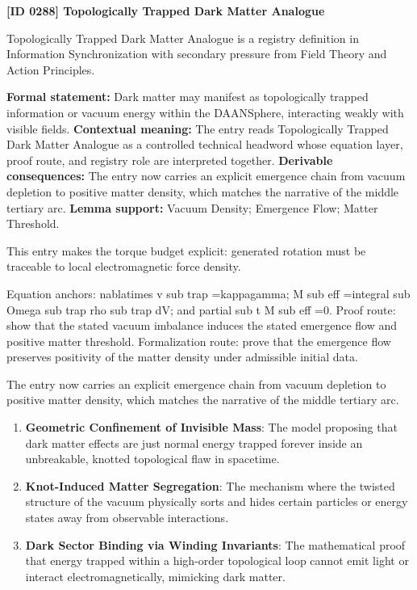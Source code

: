 \clearpage
\noindent\textbf{[ID 0288] Topologically Trapped Dark Matter Analogue}\par
\vspace{0.35em}
\begingroup\small
{}
Topologically Trapped Dark Matter Analogue is a registry definition in Information Synchronization with secondary pressure from Field Theory and Action Principles.

\begingroup\footnotesize\setlength{\emergencystretch}{3em}\sloppy
\textbf{Formal statement:} Dark matter may manifest as topologically trapped information or vacuum energy within the DAANSphere, interacting weakly with visible fields. \textbf{Contextual meaning:} The entry reads Topologically Trapped Dark Matter Analogue as a controlled technical headword whose equation layer, proof route, and registry role are interpreted together. \textbf{Derivable consequences:} The entry now carries an explicit emergence chain from vacuum depletion to positive matter density, which matches the narrative of the middle tertiary arc. \textbf{Lemma support:} Vacuum Density; Emergence Flow; Matter Threshold.\par
\endgroup

This entry makes the torque budget explicit: generated rotation must be traceable to local electromagnetic force density.

Equation anchors: nablatimes v sub trap =kappagamma; M sub eff =integral sub Omega sub trap rho sub trap dV; and partial sub t M sub eff =0. Proof route: show that the stated vacuum imbalance induces the stated emergence flow and positive matter threshold. Formalization route: prove that the emergence flow preserves positivity of the matter density under admissible initial data.

The entry now carries an explicit emergence chain from vacuum depletion to positive matter density, which matches the narrative of the middle tertiary arc.
\endgroup

\begin{enumerate}[leftmargin=1.6em,itemsep=6pt,topsep=4pt]
\item \textbf{Geometric Confinement of Invisible Mass}: The model proposing that dark matter effects are just normal energy trapped forever inside an unbreakable, knotted topological flaw in spacetime.
\item \textbf{Knot-Induced Matter Segregation}: The mechanism where the twisted structure of the vacuum physically sorts and hides certain particles or energy states away from observable interactions.
\item \textbf{Dark Sector Binding via Winding Invariants}: The mathematical proof that energy trapped within a high-order topological loop cannot emit light or interact electromagnetically, mimicking dark matter.
\end{enumerate}

